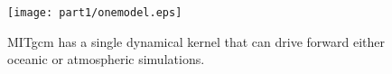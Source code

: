 \begin{figure}
\begin{center}
 \texttt{[image: part1/onemodel.eps]}
\end{center}
\caption{MITgcm has a single dynamical kernel that can drive forward
either oceanic or atmospheric simulations.}
\label{fig:onemodel}
\end{figure}
